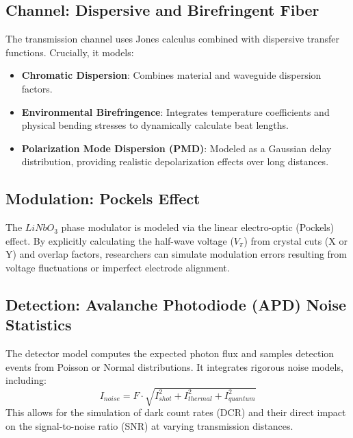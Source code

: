 \documentclass[12pt,a4paper]{article}
\begin{document}
\subsection{Channel: Dispersive and Birefringent Fiber}
The transmission channel uses Jones calculus combined with dispersive transfer functions. Crucially, it models:
\begin{itemize}
    \item \textbf{Chromatic Dispersion}: Combines material and waveguide dispersion factors.
    \item \textbf{Environmental Birefringence}: Integrates temperature coefficients and physical bending stresses to dynamically calculate beat lengths.
    \item \textbf{Polarization Mode Dispersion (PMD)}: Modeled as a Gaussian delay distribution, providing realistic depolarization effects over long distances.
\end{itemize}

\subsection{Modulation: Pockels Effect}
The $LiNbO_3$ phase modulator is modeled via the linear electro-optic (Pockels) effect. By explicitly calculating the half-wave voltage ($V_\pi$) from crystal cuts (X or Y) and overlap factors, researchers can simulate modulation errors resulting from voltage fluctuations or imperfect electrode alignment.

\subsection{Detection: Avalanche Photodiode (APD) Noise Statistics}
The detector model computes the expected photon flux and samples detection events from Poisson or Normal distributions. It integrates rigorous noise models, including:
\begin{equation}
    I_{noise} = F \cdot \sqrt{I_{shot}^2 + I_{thermal}^2 + I_{quantum}^2}
\end{equation}
This allows for the simulation of dark count rates (DCR) and their direct impact on the signal-to-noise ratio (SNR) at varying transmission distances.
\end{document}
